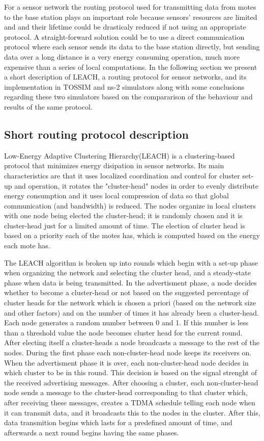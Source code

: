 For a sensor network the routing protocol used for transmitting data from motes to
the base station plays an important role because sensors' resources are limited and 
and their lifetime could be drasticaly reduced if not using an appropriate protocol.
A straight-forward solution could be to use a direct communication protocol where
each sensor sends its data to the base station directly, but sending data over a 
long distance is a very energy consuming operation, much more expensive than a series
of local computations.
In the following section we present a short description of LEACH, a routing protocol for sensor networks, and
its implementation in TOSSIM and ns-2 simulators along with some conclusions regarding 
these two simulators based on the compararison of the behaviour and results of the same protocol.  


\subsection{ Short routing protocol description}
Low-Energy Adaptive Clustering Hierarchy\cite{leach-desc}(LEACH) is a clustering-based protocol
that minimizes energy disipation in sensor networks. Its main characteristics are that
it uses localized coordination and control for cluster set-up and operation, it
rotates the "cluster-head" nodes in order to evenly distribute energy consumption and
it uses local compression of data so that global communication (and bandwidth)
is reduced.
The nodes organize in local clusters with one node being elected the cluster-head; it is randomly chosen
and it is cluster-head just for a limited amount of time. The election of cluster head
is based on a priority each of the motes has, which is computed based on the energy
each mote has.

The LEACH algorithm is broken up into rounds which begin with a set-up phase when organizing the 
network and selecting the cluster head, and a steady-state phase when data is being transmitted.
In the advertisment phase, a node decides whether to become a cluster-head or not based
on the suggested percentage of cluster heads for the network which is chosen a priori (based
on the network size and other factors) and on the number of times it has already been a cluster-head. 
Each node generates a random number between 0 and 1. If this number is less than a threshold value the node becomes cluster
head for the current round. After electing itself a cluster-heads  a node broadcasts a 
message to the rest of the nodes. During the first phase each non-cluster-head node keeps its receivers on.
When the advertisment phase it is over, each non-cluster-head node decides in which
cluster to be in this round. This decision is based on the signal strenght of the received advertising
messages.
After choosing a cluster, each non-cluster-head node sends a message
to the cluster-head corresponding to that cluster which, after receiving these messages,
creates a TDMA\cite{tdma} schedule telling each node when it can transmit data, and it broadcasts
this to the nodes in the cluster.
After this, data transmition begins which lasts for a predefined amount of time, and afterwards a next
round begins having the same phases.

